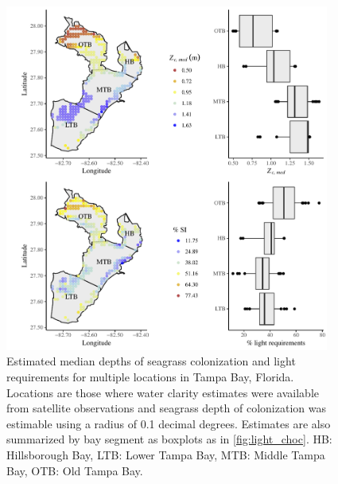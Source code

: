 \documentclass[letterpaper,12pt,oneside]{article}\usepackage[]{graphicx}\usepackage[]{color}
\begin{document}
\begin{figure}
\centering
\includegraphics[width = 0.95\textwidth]{figs/Fig8.pdf}
\caption{Estimated median depths of seagrass colonization and light requirements for multiple locations in Tampa Bay, Florida. Locations are those where water clarity estimates were available from satellite observations and seagrass depth of colonization was estimable using a radius of 0.1 decimal degrees.  Estimates are also summarized by bay segment as boxplots as in \cref{fig:light_choc}. HB: Hillsborough Bay, LTB: Lower Tampa Bay, MTB: Middle Tampa Bay, OTB: Old Tampa Bay.}
\label{fig:light_tb}
\end{figure}

\end{document}
